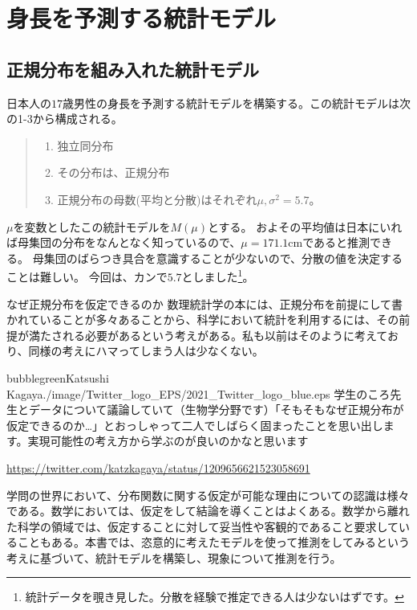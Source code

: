 \chapter{身長を予測する統計モデル}
\section{正規分布を組み入れた統計モデル}
日本人の$17$歳男性の身長を予測する統計モデルを構築する。この統計モデルは次の1-3から構成される。
\begin{quote}
    \begin{enumerate}[(1)]
    \item 独立同分布
    \item その分布は、正規分布
    \item 正規分布の母数(平均と分散)はそれぞれ$\mu,\sigma^2=5.7$。
    \end{enumerate}
\end{quote}

$\mu$を変数としたこの統計モデルを$M(\mu)$とする。
およその平均値は日本にいれば母集団の分布をなんとなく知っているので、$\mu=171.1\mathrm{cm}$であると推測できる。
母集団のばらつき具合を意識することが少ないので、分散の値を決定することは難しい。
今回は、カンで$5.7$としました\footnote{統計データを覗き見した。分散を経験で推定できる人は少ないはずです。}。


\begin{SMbox}{なぜ正規分布を仮定できるのか}
  数理統計学の本には、正規分布を前提にして書かれていることが多々あることから、科学において統計を利用するには、その前提が満たされる必要があるという考えがある。私も以前はそのように考えており、同様の考えにハマってしまう人は少なくない。

  \begin{rightbubbles}{bubblegreen}{Katsushi Kagaya}{./image/Twitter_logo_EPS/2021_Twitter_logo_blue.eps}
  学生のころ先生とデータについて議論していて（生物学分野です）「そもそもなぜ正規分布が仮定できるのか…」とおっしゃって二人でしばらく固まったことを思い出します。実現可能性の考え方から学ぶのが良いのかなと思います
      \begin{flushright} 
          \small	\url{https://twitter.com/katzkagaya/status/1209656621523058691}
      \end{flushright}    
  \end{rightbubbles}

  学問の世界において、分布関数に関する仮定が可能な理由についての認識は様々である。数学においては、仮定をして結論を導くことはよくある。数学から離れた科学の領域では、仮定することに対して妥当性や客観的であること要求していることもある。本書では、恣意的に考えたモデルを使って推測をしてみるという考えに基づいて、統計モデルを構築し、現象について推測を行う。
\end{SMbox}


